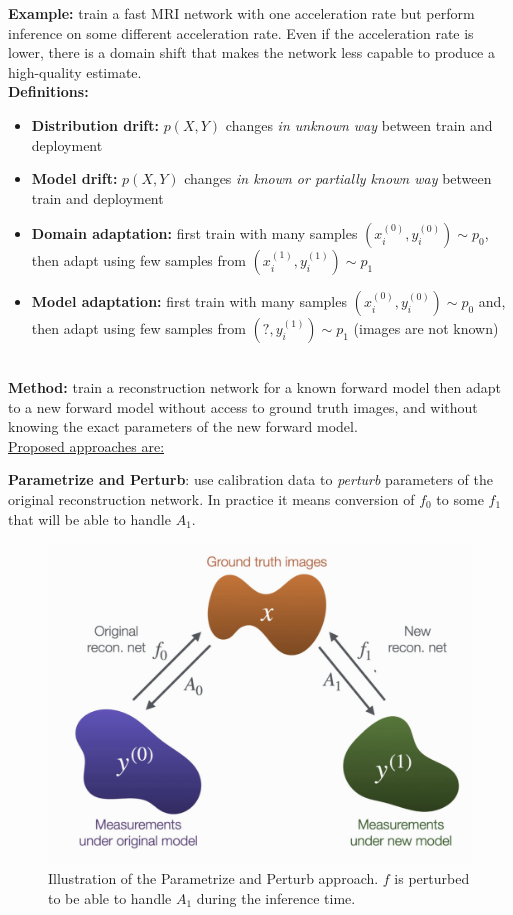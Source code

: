 {\bf Example:} train a fast MRI network with one acceleration rate but perform inference on some different acceleration rate. 
Even if the acceleration rate is lower, there is a domain shift that makes the network less capable to produce a high-quality estimate. \\

{\bf Definitions:} 
\begin{itemize}
    \item {\bf Distribution drift:} $p(X, Y)$ changes \textit{in unknown way} between train and deployment
    \item {\bf Model drift:} $p(X, Y)$ changes \textit{in known or partially known way} between train and deployment
    \item {\bf Domain adaptation:} first train with many samples $(x_i^{(0)}, y_i^{(0)}) \sim p_0$, then adapt using few samples from $(x_i^{(1)}, y_i^{(1)}) \sim p_1$
    \item {\bf Model adaptation:} first train with many samples $(x_i^{(0)}, y_i^{(0)}) \sim p_0$ and, then adapt using few samples from  $(?, y_i^{(1)}) \sim p_1$ (images are not known) 
\end{itemize}
\\ 

{\bf Method:} train a reconstruction network for a known forward model then adapt to a new forward model without access to ground truth images, and without knowing the exact parameters of the new forward model. \\

\underline{Proposed approaches are:}   

{\bf Parametrize and Perturb}: use calibration data to \textit{perturb} parameters of the original reconstruction network. 
In practice it means conversion of $f_0$ to some $f_1$ that will be able to handle $A_1$.

\begin{figure}[h!]
    \centering
    \includegraphics[scale=0.4]{neurips-2020/images/Screenshot 2020-12-13 at 21.21.21.png}
    \caption{Illustration of the Parametrize and Perturb approach. $f$ is perturbed to be able to handle $A_1$ during the inference time.}
    \label{fig:PP_approach}
\end{figure} \\

